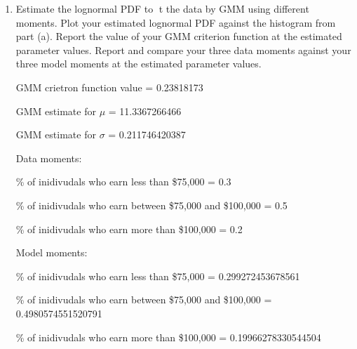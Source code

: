 \documentclass[letterpaper,12pt]{article}
\theoremstyle{definition}
\begin{document}
\begin{enumerate}
\begin{enumerate}
\item Estimate the lognormal PDF to t the data by GMM using different moments. Plot your estimated lognormal PDF against the histogram from part (a). Report the value of your GMM criterion function at the estimated parameter values. Report and compare your three data moments against your three model moments at the estimated parameter values.
\par
\begin{figure}[H]\centering\captionsetup{width=4.0in}
\end{figure}
\par
GMM crietron function value = 0.23818173\par
GMM estimate for $\mu$ = 11.3367266466 \par
GMM estimate for $\sigma$ = 0.211746420387\par
Data moments:\par
\hspace{2mm}\% of inidivudals who earn less than \$75,000 = 0.3\par
\hspace{2mm}\% of inidivudals who earn between \$75,000 and \$100,000 = 0.5\par
\hspace{2mm}\% of inidivudals who earn more than \$100,000 = 0.2\par
Model moments: \par
\hspace{2mm}\% of inidivudals who earn less than \$75,000 = 0.299272453678561 \par
\hspace{2mm}\% of inidivudals who earn between \$75,000 and \$100,000 = 0.4980574551520791 \par
\hspace{2mm}\% of inidivudals who earn more than \$100,000 = 0.19966278330544504
\par\bigskip


\end{enumerate}
\end{enumerate}
\end{document}
